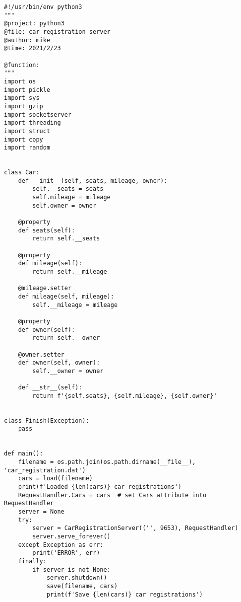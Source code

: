 \begin{lstlisting}
#!/usr/bin/env python3
"""
@project: python3
@file: car_registration_server
@author: mike
@time: 2021/2/23
 
@function:
"""
import os
import pickle
import sys
import gzip
import socketserver
import threading
import struct
import copy
import random


class Car:
    def __init__(self, seats, mileage, owner):
        self.__seats = seats
        self.mileage = mileage
        self.owner = owner

    @property
    def seats(self):
        return self.__seats

    @property
    def mileage(self):
        return self.__mileage

    @mileage.setter
    def mileage(self, mileage):
        self.__mileage = mileage

    @property
    def owner(self):
        return self.__owner

    @owner.setter
    def owner(self, owner):
        self.__owner = owner

    def __str__(self):
        return f'{self.seats}, {self.mileage}, {self.owner}'


class Finish(Exception):
    pass


def main():
    filename = os.path.join(os.path.dirname(__file__), 'car_registration.dat')
    cars = load(filename)
    print(f'Loaded {len(cars)} car registrations')
    RequestHandler.Cars = cars  # set Cars attribute into RequestHandler
    server = None
    try:
        server = CarRegistrationServer(('', 9653), RequestHandler)
        server.serve_forever()
    except Exception as err:
        print('ERROR', err)
    finally:
        if server is not None:
            server.shutdown()
            save(filename, cars)
            print(f'Save {len(cars)} car registrations')



\end{lstlisting}

